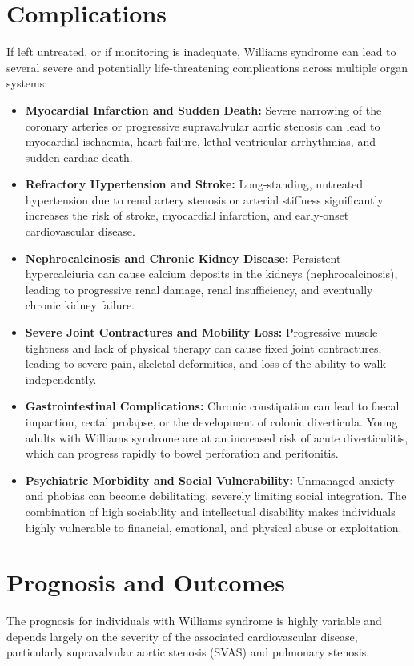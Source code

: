 \section*{Complications}
If left untreated, or if monitoring is inadequate, Williams syndrome can lead to several severe and potentially life-threatening complications across multiple organ systems:
\begin{itemize}
    \item \textbf{Myocardial Infarction and Sudden Death:} Severe narrowing of the coronary arteries or progressive supravalvular aortic stenosis can lead to myocardial ischaemia, heart failure, lethal ventricular arrhythmias, and sudden cardiac death.
    \item \textbf{Refractory Hypertension and Stroke:} Long-standing, untreated hypertension due to renal artery stenosis or arterial stiffness significantly increases the risk of stroke, myocardial infarction, and early-onset cardiovascular disease.
    \item \textbf{Nephrocalcinosis and Chronic Kidney Disease:} Persistent hypercalciuria can cause calcium deposits in the kidneys (nephrocalcinosis), leading to progressive renal damage, renal insufficiency, and eventually chronic kidney failure.
    \item \textbf{Severe Joint Contractures and Mobility Loss:} Progressive muscle tightness and lack of physical therapy can cause fixed joint contractures, leading to severe pain, skeletal deformities, and loss of the ability to walk independently.
    \item \textbf{Gastrointestinal Complications:} Chronic constipation can lead to faecal impaction, rectal prolapse, or the development of colonic diverticula. Young adults with Williams syndrome are at an increased risk of acute diverticulitis, which can progress rapidly to bowel perforation and peritonitis.
    \item \textbf{Psychiatric Morbidity and Social Vulnerability:} Unmanaged anxiety and phobias can become debilitating, severely limiting social integration. The combination of high sociability and intellectual disability makes individuals highly vulnerable to financial, emotional, and physical abuse or exploitation.
\end{itemize}

\section*{Prognosis and Outcomes}
The prognosis for individuals with Williams syndrome is highly variable and depends largely on the severity of the associated cardiovascular disease, particularly supravalvular aortic stenosis (SVAS) and pulmonary stenosis.

